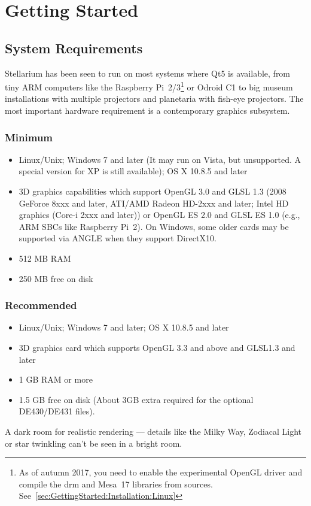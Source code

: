 

\chapter{Getting Started}
\label{ch:GettingStarted}

\section{System Requirements}
\label{sec:GettingStarted:SystemRequirements}

Stellarium has been seen to run on most systems where Qt5 is
available, from tiny ARM computers like the Raspberry Pi~2/3\footnote{As
  of autumn 2017, you need to enable the experimental OpenGL driver
  and compile the drm and Mesa~17 libraries from sources. 
  See~\ref{sec:GettingStarted:Installation:Linux}} 
or Odroid C1 to big museum installations with multiple projectors 
and planetaria with fish-eye projectors. 
The most important hardware requirement is a contemporary graphics subsystem.


\subsection{Minimum}
\begin{itemize}
\item Linux/Unix; Windows 7 and later (It may run on Vista, but unsupported. A special version for XP is still available); OS X 10.8.5 and later
\item 3D graphics capabilities which support OpenGL 3.0 and GLSL 1.3 (2008
  GeForce 8xxx and later, ATI/AMD Radeon HD-2xxx and later; Intel HD
  graphics (Core-i 2xxx and later)) or OpenGL ES 2.0 and GLSL ES 1.0
  (e.g., ARM SBCs like Raspberry Pi~2). On Windows, some older cards
  may be supported via ANGLE when they support DirectX10.
\item 512 MB RAM
\item 250 MB free on disk
\end{itemize}

\subsection{Recommended}
\begin{itemize}
\item Linux/Unix; Windows 7 and later; OS X 10.8.5 and later
\item 3D graphics card which supports OpenGL 3.3 and above and GLSL1.3 and later
\item 1 GB RAM or more
\item 1.5 GB free on disk (About 3GB extra required for the optional DE430/DE431 files).
\end{itemize}
 A dark room for realistic rendering --- details like the Milky Way, Zodiacal Light or
star twinkling can't be seen in a bright room.



